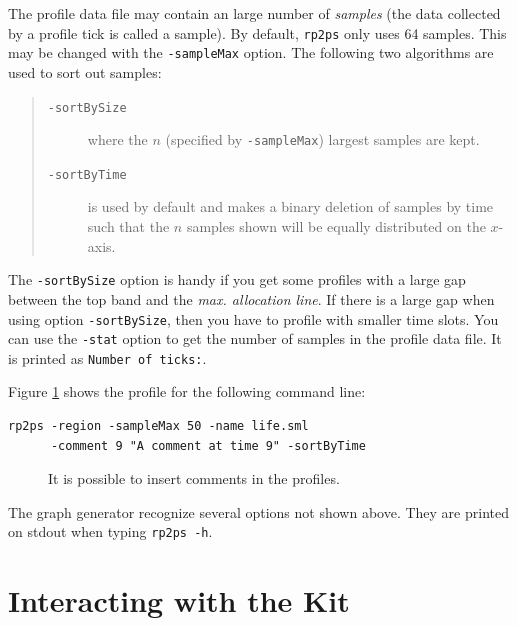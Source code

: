 \documentclass[12pt]{book}
\begin{document}
The profile data file may contain an large number of \emph{samples}
(the data collected by a profile tick is called a sample). By default,
\texttt{rp2ps} only uses 64 samples. This may be changed with the
\texttt{-sampleMax} option. The following two algorithms are used to sort
out samples:
\begin{quote}
\begin{description}
\item[{\tt -sortBySize}] where the $n$ (specified by \texttt{-sampleMax})
  largest samples are kept.
\item[{\tt -sortByTime}] is used by default and makes a binary deletion of
  samples by time such that the $n$ samples shown will be equally
  distributed on the $x$-axis.
\end{description}
\end{quote}
\noindent
The \texttt{-sortBySize} option is handy if you get some profiles
with a large gap between the top band and the \emph{max. allocation line}.
If there is a large gap when using option \texttt{-sortBySize}, then you
have to profile with smaller time slots. You can use the 
\texttt{-stat}
option to get the number of samples in the profile data file. It is printed
as \texttt{Number of ticks:}.

Figure \ref{prof_eks4.fig} shows the profile for the following
command line:
\begin{verbatim}
rp2ps -region -sampleMax 50 -name life.sml 
      -comment 9 "A comment at time 9" -sortByTime
\end{verbatim}
\noindent

\begin{figure}[htb]
\begin{center}
  \caption{It is possible to insert comments in the profiles.}\label{prof_eks4.fig}
\end{center}
\end{figure}
The graph generator recognize several options not shown above. They are
printed on stdout when typing \texttt{rp2ps -h}.
%

\chapter{Interacting with the Kit}
\end{document}
